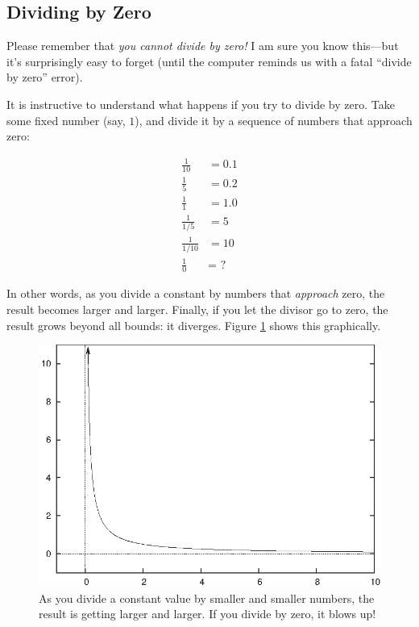 \subsection{Dividing by Zero}


Please remember that \emph{you cannot divide by zero!} I am sure you
know this---but it's surprisingly easy to forget (until the computer
reminds us with a fatal ``divide by zero'' error).

It is instructive to understand what happens if you try to divide by
zero.  Take some fixed number (say, $1$), and divide it by a
sequence of numbers that approach zero:

\begin{align*}
\frac{1}{10}   & = 0.1 \\[3pt]
\frac{1}{5}    & = 0.2 \\[3pt]
\frac{1}{1}    & = 1.0 \\[3pt]
\frac{1}{1/5}  & = 5 \\[3pt]
\frac{1}{1/10} & = 10 \\[3pt]
\frac{1}{0}    & = \text{ ?}
\end{align*}

In other words, as you divide a constant by numbers that
\emph{approach} zero, the result becomes larger and larger. Finally,
if you let the divisor go to zero, the result grows beyond all bounds: it
diverges. Figure \ref{fig:zerodivisor} shows this graphically.

\begin{figure}
  \centerline{\includegraphics{img/zerodivisor}}
  \caption{As you divide a constant value by smaller and smaller
    numbers, the result is getting larger and larger. If you divide by
    zero, it blows up!}
  \label{fig:zerodivisor}
\end{figure}

